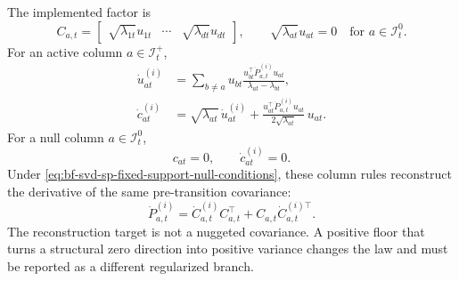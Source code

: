 The implemented factor is
\begin{equation}
\label{eq:bf-svd-sp-fixed-support-factor}
  C_{a,t}
  =
  \begin{bmatrix}
    \sqrt{\lambda_{1t}}u_{1t} & \cdots & \sqrt{\lambda_{dt}}u_{dt}
  \end{bmatrix},
  \qquad
  \sqrt{\lambda_{at}}u_{at}=0
  \quad\text{for }a\in\mathcal I_t^0 .
\end{equation}
For an active column $a\in\mathcal I_t^+$,
\begin{align}
\label{eq:bf-svd-sp-fixed-support-eigenvector-first}
  \dot u_{at}^{(i)}
  &=
  \sum_{b\ne a}
  u_{bt}
  \frac{u_{bt}^\top\dot P_{a,t}^{(i)}u_{at}}
       {\lambda_{at}-\lambda_{bt}},\\
\label{eq:bf-svd-sp-fixed-support-column-first}
  \dot c_{at}^{(i)}
  &=
  \sqrt{\lambda_{at}}\,\dot u_{at}^{(i)}
  +
  \frac{u_{at}^\top\dot P_{a,t}^{(i)}u_{at}}
       {2\sqrt{\lambda_{at}}}\,u_{at}.
\end{align}
For a null column $a\in\mathcal I_t^0$,
\begin{equation}
\label{eq:bf-svd-sp-fixed-support-null-column}
  c_{at}=0,\qquad \dot c_{at}^{(i)}=0.
\end{equation}
Under \eqref{eq:bf-svd-sp-fixed-support-null-conditions}, these column rules
reconstruct the derivative of the same pre-transition covariance:
\begin{equation}
\label{eq:bf-svd-sp-fixed-support-reconstruction}
  \dot P_{a,t}^{(i)}
  =
  \dot C_{a,t}^{(i)}C_{a,t}^\top
  +C_{a,t}\dot C_{a,t}^{(i)\top}.
\end{equation}
The reconstruction target is not a nuggeted covariance.  A positive floor that
turns a structural zero direction into positive variance changes the law and
must be reported as a different regularized branch.


